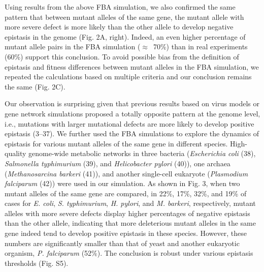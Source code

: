 Using results from the above FBA simulation, we also confirmed the
same pattern that between mutant alleles of the same gene, the mutant
allele with more severe defect is more likely than the other allele to
develop negative epistasis in the genome (Fig. 2A, right). Indeed, an
even higher percentage of mutant allele pairs in the FBA simulation
($\approx$~70\%) than in real experiments (60\%) support this
conclusion. To avoid possible bias from the definition of epistasis
and fitness differences between mutant alleles in the FBA simulation,
we repeated the calculations based on multiple criteria and our
conclusion remains the same (Fig. 2C).

Our observation is surprising given that previous results based on
virus models or gene network simulations proposed a totally opposite
pattern at the genome level, i.e., mutations with larger mutational
defects are more likely to develop positive epistasis (3–37). We
further used the FBA simulations to explore the dynamics of epistasis
for various mutant alleles of the same gene in different
species. High-quality genome-wide metabolic networks in three bacteria
(\textit{Escherichia coli} (38), \textit{Salmonella typhimurium} (39),
and \textit{Helicobacter pylori} (40)), one archaea
(\textit{Methanosarcina barkeri} (41)), and another single-cell
eukaryote (\textit{Plasmodium falciparum} (42)) were used in our
simulation. As shown in Fig. 3, when two mutant alleles of the same
gene are compared, in 22\%, 17\%, 32\%, and 19\% of cases for
\textit{E. coli}, \textit{S. typhimurium}, \textit{H. pylori}, and
\textit{M. barkeri}, respectively, mutant
alleles with more severe defects display higher percentages of
negative epistasis than the other allele, indicating that more
deleterious mutant alleles in the same gene indeed tend to develop
positive epistasis in these species. However, these numbers are
significantly smaller than that of yeast and another eukaryotic
organism, \textit{P. falciparum} (52\%). The conclusion is robust
under various epistasis thresholds (Fig. S5).

